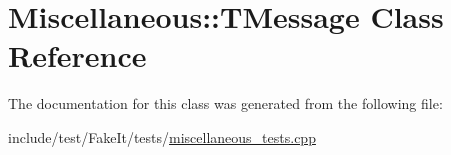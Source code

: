 \hypertarget{classMiscellaneous_1_1TMessage}{}\section{Miscellaneous\+::T\+Message Class Reference}
\label{classMiscellaneous_1_1TMessage}


The documentation for this class was generated from the following file\+:\begin{DoxyCompactItemize}
\item 
include/test/\+Fake\+It/tests/\mbox{\hyperlink{miscellaneous__tests_8cpp}{miscellaneous\+\_\+tests.\+cpp}}\end{DoxyCompactItemize}
